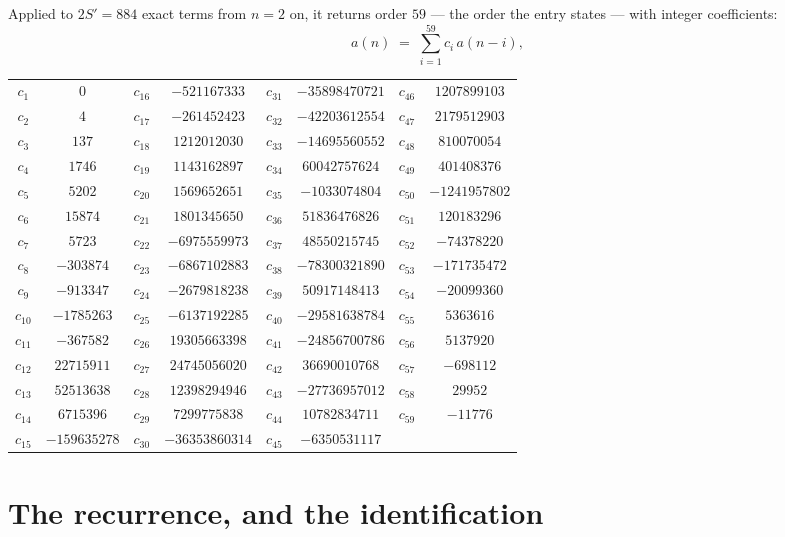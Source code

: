 \documentclass[11pt,a4paper]{article}
\theoremstyle{plain}
\theoremstyle{definition}
\begin{document}
Applied to $2S'=884$ exact terms from $n=2$ on, it returns order $59$ --- the
order the entry states --- with integer coefficients:
\[
a(n)\;=\;\sum_{i=1}^{59}c_i\,a(n-i),
\]
\begin{center}\small
\begin{tabular}{cccccccc}
$c_{1}$ & $0$ & $c_{16}$ & $-521167333$ & $c_{31}$ & $-35898470721$ & $c_{46}$ & $1207899103$ \\
$c_{2}$ & $4$ & $c_{17}$ & $-261452423$ & $c_{32}$ & $-42203612554$ & $c_{47}$ & $2179512903$ \\
$c_{3}$ & $137$ & $c_{18}$ & $1212012030$ & $c_{33}$ & $-14695560552$ & $c_{48}$ & $810070054$ \\
$c_{4}$ & $1746$ & $c_{19}$ & $1143162897$ & $c_{34}$ & $60042757624$ & $c_{49}$ & $401408376$ \\
$c_{5}$ & $5202$ & $c_{20}$ & $1569652651$ & $c_{35}$ & $-1033074804$ & $c_{50}$ & $-1241957802$ \\
$c_{6}$ & $15874$ & $c_{21}$ & $1801345650$ & $c_{36}$ & $51836476826$ & $c_{51}$ & $120183296$ \\
$c_{7}$ & $5723$ & $c_{22}$ & $-6975559973$ & $c_{37}$ & $48550215745$ & $c_{52}$ & $-74378220$ \\
$c_{8}$ & $-303874$ & $c_{23}$ & $-6867102883$ & $c_{38}$ & $-78300321890$ & $c_{53}$ & $-171735472$ \\
$c_{9}$ & $-913347$ & $c_{24}$ & $-2679818238$ & $c_{39}$ & $50917148413$ & $c_{54}$ & $-20099360$ \\
$c_{10}$ & $-1785263$ & $c_{25}$ & $-6137192285$ & $c_{40}$ & $-29581638784$ & $c_{55}$ & $5363616$ \\
$c_{11}$ & $-367582$ & $c_{26}$ & $19305663398$ & $c_{41}$ & $-24856700786$ & $c_{56}$ & $5137920$ \\
$c_{12}$ & $22715911$ & $c_{27}$ & $24745056020$ & $c_{42}$ & $36690010768$ & $c_{57}$ & $-698112$ \\
$c_{13}$ & $52513638$ & $c_{28}$ & $12398294946$ & $c_{43}$ & $-27736957012$ & $c_{58}$ & $29952$ \\
$c_{14}$ & $6715396$ & $c_{29}$ & $7299775838$ & $c_{44}$ & $10782834711$ & $c_{59}$ & $-11776$ \\
$c_{15}$ & $-159635278$ & $c_{30}$ & $-36353860314$ & $c_{45}$ & $-6350531117$ &  &  \\
\end{tabular}
\end{center}

\section{The recurrence, and the identification}
\end{document}
